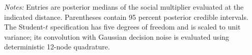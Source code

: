 \documentclass[12pt]{article}
\begin{document}
\begin{table}[htbp]
  \centering
  \small
  \caption{Social multipliers under Gaussian and heavy-tailed intrinsic motivation}
  \label{tab:student-t-multipliers}
  \begin{threeparttable}
    
    \begin{tablenotes}\footnotesize
      \item \textit{Notes:} Entries are posterior medians of the social
      multiplier evaluated at the indicated distance. Parentheses contain 95
      percent posterior credible intervals. The Student-$t$ specification has
      five degrees of freedom and is scaled to unit variance; its convolution
      with Gaussian decision noise is evaluated using deterministic 12-node
      quadrature.
    \end{tablenotes}
  \end{threeparttable}
\end{table}
\end{document}
